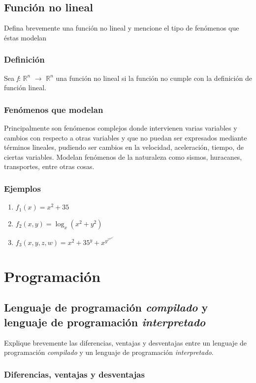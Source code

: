 \documentclass[12pt, letterpaper]{article}
\begin{document}
\subsection{Funci\'on no lineal}
Defina brevemente una función no lineal y mencione el tipo de fenómenos que éstas modelan

\subsubsection{Definición}
Sea \textit{f}: $\mathbb{R}^n$ $\rightarrow$ $\mathbb{R}^n$ una función no lineal si la función no cumple con la definición de función lineal.
\subsubsection{Fenómenos que modelan}
Principalmente son fenómenos complejos donde intervienen varias variables y cambios con respecto a otras variables y que no puedan ser expresados mediante términos lineales, pudiendo ser cambios en la velocidad, aceleración, tiempo, de ciertas variables. Modelan fenómenos de la naturaleza como sismos, huracanes, transportes, entre otras cosas.
\subsubsection{Ejemplos}
\begin{enumerate}
\item $f_1(x)=x^2+35$
\item $f_2(x,y)=\log_{x}(x^2+y^2)$
\item $f_3(x,y,z,w)=x^2+35^y+x^{y^{z^{w^{w^{x^{y^{z}}}}}}}$
\end{enumerate}

\section{Programaci\'on}
\subsection{Lenguaje de programaci\'on \textit{compilado} y lenguaje de programaci\'on \textit{interpretado}}
Explique brevemente las diferencias, ventajas y desventajas entre un lenguaje de programaci\'on \textit{compilado} y un lenguaje de programaci\'on \textit{interpretado}.
\subsubsection{Diferencias, ventajas y desventajas}
\end{document}
